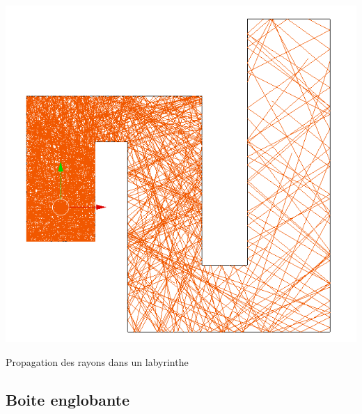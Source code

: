 \begin{figureth}
		\includegraphics[width=0.5\linewidth]{images/test0}
		\caption{Propagation des rayons dans un labyrinthe}
		\label{test0}
\end{figureth}		

\subsection{Boite englobante}

